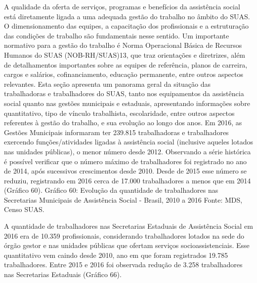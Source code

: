\documentclass[
  brazilian]{report}
\begin{document}
A qualidade da oferta de serviços, programas e benefícios da assistência
social está diretamente ligada a uma adequada gestão do trabalho no
âmbito do SUAS. O dimensionamento das equipes, a capacitação dos
profissionais e a estruturação das condições de trabalho são
fundamentais nesse sentido. Um importante normativo para a gestão do
trabalho é Norma Operacional Básica de Recursos Humanos do SUAS
(NOB-RH/SUAS)13, que traz orientações e diretrizes, além de
detalhamentos importantes sobre as equipes de referência, planos de
carreira, cargos e salários, cofinanciamento, educação permanente, entre
outros aspectos relevantes. Esta seção apresenta um panorama geral da
situação das trabalhadoras e trabalhadores do SUAS, tanto nos
equipamentos da assistência social quanto nas gestões municipais e
estaduais, apresentando informações sobre quantitativo, tipo de vínculo
trabalhista, escolaridade, entre outros aspectos referentes à gestão do
trabalho, e sua evolução ao longo dos anos. Em 2016, as Gestões
Municipais informaram ter 239.815 trabalhadoras e trabalhadores
exercendo funções/atividades ligadas à assistência social (inclusive
aqueles lotados nas unidades públicas), o menor número desde 2012.
Observando a série histórica é possível verificar que o número máximo de
trabalhadores foi registrado no ano de 2014, após sucessivos
crescimentos desde 2010. Desde de 2015 esse número se reduziu,
registrando em 2016 cerca de 17.000 trabalhadores a menos que em 2014
(Gráfico 60). Gráfico 60: Evolução da quantidade de trabalhadores nas
Secretarias Municipais de Assistência Social - Brasil, 2010 a 2016
Fonte: MDS, Censo SUAS.

A quantidade de trabalhadores nas Secretarias Estaduais de Assistência
Social em 2016 era de 10.359 profissionais, considerando trabalhadores
lotados na sede do órgão gestor e nas unidades públicas que ofertam
serviços socioassistenciais. Esse quantitativo vem caindo desde 2010,
ano em que foram registrados 19.785 trabalhadores. Entre 2015 e 2016 foi
observada redução de 3.258 trabalhadores nas Secretarias Estaduais
(Gráfico 66).
\end{document}
